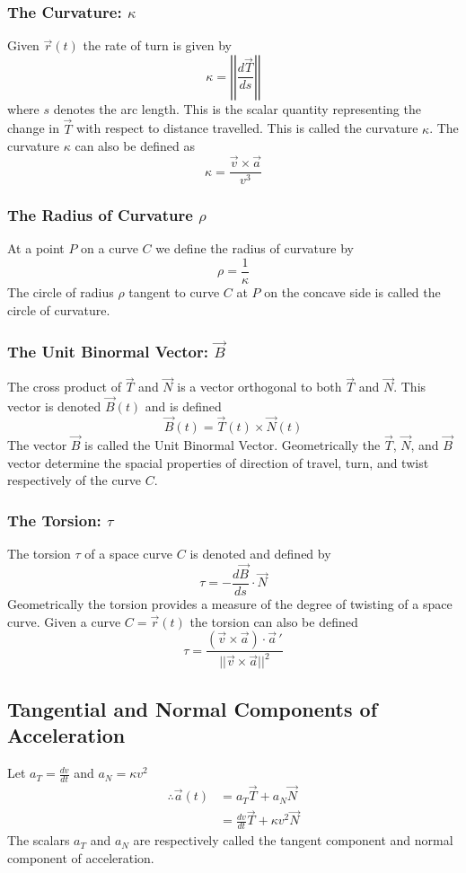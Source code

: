 \documentclass[14pt]{article}
\begin{document}
    \subsubsection{The Curvature: $\kappa$}
    Given $\vec r(t)$ the rate of turn is given by
    $$\kappa=\left|\left|\frac{d\vec T}{ds}\right|\right|$$ where $s$
    denotes the arc length. This is the scalar quantity representing the
    change in $\vec T$ with respect to distance  travelled. This is
    called the curvature $\kappa$. The curvature $\kappa$ can also be
    defined as
    $$\kappa=\frac{\vec{v}\times\vec{a}}{v^3}$$
    \subsubsection{The Radius of Curvature $\rho$}
    At a point $P$ on a curve $C$ we define the radius of curvature by
    $$\rho=\frac{1}{\kappa}$$ The circle of radius $\rho$ tangent to
    curve $C$ at $P$ on the concave side is called the circle of
    curvature.
    \subsubsection{The Unit Binormal Vector: $\vec B$}
    The cross product of $\vec T$ and $\vec N$ is a vector orthogonal to
    both $\vec T$ and $\vec N$. This vector is denoted $\vec B(t)$ and
    is defined
    $$\vec B(t)=\vec T(t)\times \vec N(t)$$ The vector $\vec B$ is
    called the Unit Binormal Vector. Geometrically the $\vec T$, $\vec
    N$, and $\vec B$ vector determine the spacial properties of
    direction of travel, turn, and twist respectively of the curve $C$.
    \subsubsection{The Torsion: $\tau$}
    The torsion $\tau$ of a space curve $C$ is denoted and defined by 
    $$\tau=-\frac{d\vec B}{ds}\cdot\vec N$$ Geometrically the torsion
    provides a measure of the degree of twisting of a space curve. Given
    a curve $C=\vec r(t)$ the torsion can also be defined
    $$\tau=\frac{(\vec v\times \vec a)\cdot\vec a\,'}{||\vec v\times\vec
    a||^2}$$
    \subsection{Tangential and Normal Components of Acceleration}
    Let $a_T=\frac{dv}{dt}$ and $a_N=\kappa v^2$
    \begin{align*}
        \therefore \vec a(t)&=a_T \vec T+ a_N \vec N\\
        &=\frac{dv}{dt}\vec T+\kappa v^2\vec N
    \end{align*}
    The scalars $a_T$ and $a_N$ are respectively called the tangent
    component and normal component of acceleration.
\end{document}
